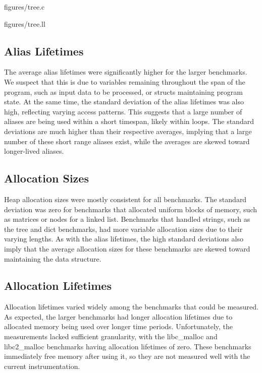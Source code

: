  {figures/tree.c}

 {figures/tree.ll}

\subsection{Alias Lifetimes}
The average alias lifetimes were significantly higher for the larger benchmarks. We suspect that this is due to variables remaining throughout the span of the program, such as input data to be processed, or structs maintaining program state. At the same time, the standard deviation of the alias lifetimes was also high, reflecting varying access patterns. This suggests that a large number of aliases are being used within a short timespan, likely within loops. The standard deviations are much higher than their respective averages, implying that a large number of these short range aliases exist, while the averages are skewed toward longer-lived aliases.

\subsection{Allocation Sizes}
Heap allocation sizes were mostly consistent for all benchmarks. The standard deviation was zero for benchmarks that allocated uniform blocks of memory, such as matrices or nodes for a linked list. Benchmarks that handled strings, such as the tree and dict benchmarks, had more variable allocation sizes due to their varying lengths. As with the alias lifetimes, the high standard deviations also imply that the average allocation sizes for these benchmarks are skewed toward maintaining the data structure.

\subsection{Allocation Lifetimes}
Allocation lifetimes varied widely among the benchmarks that could be measured. As expected, the larger benchmarks had longer allocation lifetimes due to allocated memory being used over longer time periods. Unfortunately, the measurements lacked sufficient granularity, with the libc\_malloc and libc2\_malloc benchmarks having allocation lifetimes of zero. These benchmarks immediately free memory after using it, so they are not measured well with the current instrumentation.
